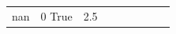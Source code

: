 \begin{table}[H]
\begin{tabular}{lllrlllll}
nan & 0%
\cline{1-9}
True & 2.5%

\end{tabular}
\end{table}
